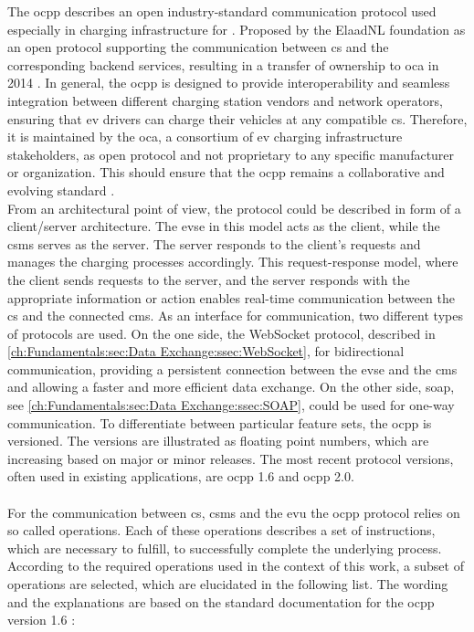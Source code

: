 The \acrfull{ocpp} describes an open industry-standard communication protocol used especially in charging infrastructure for . Proposed by the ElaadNL foundation as an open protocol supporting the communication between \acrshort{cs} and the corresponding backend services, resulting in a transfer of ownership to \acrshort{oca} in 2014 \cite{garofalaki_electric_2022}.
In general, the \acrshort{ocpp} is designed to provide interoperability and seamless integration between different charging station vendors and network operators, ensuring that \acrshort{ev} drivers can charge their vehicles at any compatible \acrshort{cs}. 
Therefore, it is maintained by the \acrfull{oca}, a consortium of \acrshort{ev} charging infrastructure stakeholders, as open protocol and not proprietary to any specific manufacturer or organization. 
This should ensure that the \acrshort{ocpp} remains a collaborative and evolving standard \cite{noauthor_ocpp_nodate}. \\
From an architectural point of view, the protocol could be described in form of a client/server architecture. The \acrshort{evse} in this model acts as the client, while the \acrshort{csms} serves as the server. 
The server responds to the client's requests and manages the charging processes accordingly. This request-response model, where the client sends requests to the server, and the server responds with the appropriate information or action enables real-time communication between the \acrfull{cs} and the connected \acrfull{cms}.
As an interface for communication, two different types of protocols are used. On the one side, the WebSocket protocol, described in \ref{ch:Fundamentals:sec:Data Exchange:ssec:WebSocket}, for bidirectional communication, providing a persistent connection between the \acrshort{evse} and the \acrshort{cms} and allowing a faster and more efficient data exchange. On the other side, \acrfull{soap}, see \ref{ch:Fundamentals:sec:Data Exchange:ssec:SOAP}, could be used for one-way communication.
To differentiate between particular feature sets, the \acrshort{ocpp} is versioned. 
The versions are illustrated as floating point numbers, which are increasing based on major or minor releases. 
The most recent protocol versions, often used in existing applications, are \acrshort{ocpp} 1.6 and \acrshort{ocpp} 2.0. \\ \\
\noindent For the communication between \acrshort{cs}, \acrshort{csms} and the \acrshort{evu} the \acrshort{ocpp} protocol relies on so called operations. Each of these operations describes a set of instructions, which are necessary to fulfill, to successfully complete the underlying process.
According to the required operations used in the context of this work, a subset of operations are selected, which are elucidated in the following list. 
The wording and the explanations are based on the standard documentation for the \acrshort{ocpp} version 1.6 \cite{noauthor_ocpp_nodate}:

